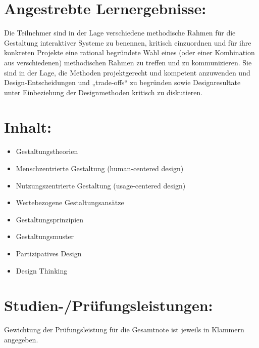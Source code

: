 \section*{Angestrebte
Lernergebnisse:\label{/mi-2017/modulbeschreibungen-master/MA_HCI_Design_Methodologies}}\label{angestrebte-lernergebnissepathlabelmi-2017modulbeschreibungen-mastermaux5fhciux5fdesignux5fmethodologies}

Die Teilnehmer sind in der Lage verschiedene methodische Rahmen für die
Gestaltung interaktiver Systeme zu benennen, kritisch einzuordnen und
für ihre konkreten Projekte eine rational begründete Wahl eines (oder
einer Kombination aus verschiedenen) methodischen Rahmen zu treffen und
zu kommunizieren. Sie sind in der Lage, die Methoden projektgerecht und
kompetent anzuwenden und Design-Entscheidungen und „trade-offs`` zu
begründen sowie Designresultate unter Einbeziehung der Designmethoden
kritisch zu diskutieren.

\section*{Inhalt:\label{/mi-2017/modulbeschreibungen-master/MA_HCI_Design_Methodologies}}\label{inhaltpathlabelmi-2017modulbeschreibungen-mastermaux5fhciux5fdesignux5fmethodologies}

\begin{itemize}
\tightlist
\item
  Gestaltungstheorien
\item
  Menschzentrierte Gestaltung (human-centered design)
\item
  Nutzungszentrierte Gestaltung (usage-centered design)
\item
  Wertebezogene Gestaltungsansätze
\item
  Gestaltungsprinzipien
\item
  Gestaltungsmuster
\item
  Partizipatives Design
\item
  Design Thinking
\end{itemize}

\section*{Studien-/Prüfungsleistungen:\label{/mi-2017/modulbeschreibungen-master/MA_HCI_Design_Methodologies}}\label{studien-pruxfcfungsleistungenpathlabelmi-2017modulbeschreibungen-mastermaux5fhciux5fdesignux5fmethodologies}

Gewichtung der Prüfungsleistung für die Gesamtnote ist jeweils in
Klammern angegeben.

